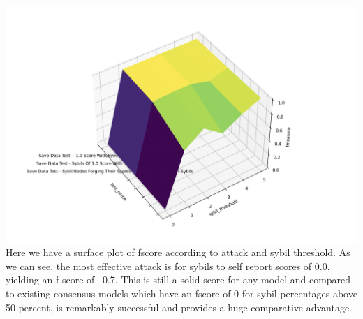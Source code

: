 \documentclass{article}
\begin{document}
\includegraphics[width=\textwidth, height=\textwidth]{f-score-surface-plot}
Here we have a surface plot of fscore according to attack and sybil threshold. As we can see, the most effective attack is for sybils to self report scores of 0.0, yielding an f-score of ~0.7. This is still a solid score for any model and compared to existing consensus models which have an fscore of 0 for sybil percentages above 50 percent, is remarkably successful and provides a huge comparative advantage.
\end{document}
